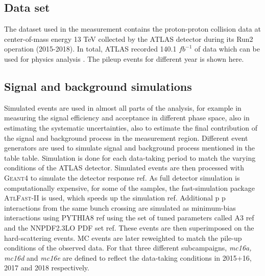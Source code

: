 \subsection{Data set}

The dataset used in the measurement contains the proton-proton collision data at center-of-mass energy 13 TeV collected by the ATLAS detector during its Run2 operation (2015-2018). In total, ATLAS recorded 140.1 $fb^{-1}$ of data which can be used for physics analysis \cite{Aad_2020}. The pileup events for different year is shown here.



\subsection{Signal and background simulations}
Simulated events are used in almost all parts of the analysis, for example in measuring the signal efficiency and acceptance in different phase space, also in estimating the systematic uncertainties, also to estimate the final contribution of the signal and background process in the measurement region. Different event generators are used to simulate signal and background process mentioned in the table {table}. Simulation is done for each data-taking period to match the varying conditions of the ATLAS detector.
Simulated events are then processed with \textsc{Geant4} to simulate the detector response {ref}. As full detector simulation is computationally expensive, for some of the samples, the fast-simulation package \textsc{AtlFast-II} is used, which speeds up the simulation {ref}. Additional p p interactions from the same bunch crossing are simulated as minimum-bias interactions using PYTHIA8 {ref} using the set of tuned parameters called A3 {ref} and the NNPDF2.3LO PDF set {ref}. These events are then superimposed on the hard-scattering events. MC events are later reweighted to match the pile-up conditions of the observed data. For that three different subcampaigns, \textit{mc16a, mc16d} and \textit{mc16e} are defined to reflect the data-taking conditions in 2015+16, 2017 and 2018 respectively.

